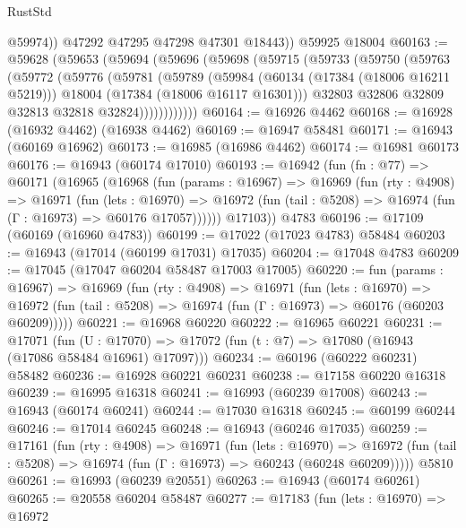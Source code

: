 \begin{lexlean}{RustStd}
\begin{coremodule}
            @59974))
        @47292
        @47295
        @47298
        @47301
        @18443))
    @59925
    @18004
@60163 := @59628
    (@59653
      (@59694
        (@59696
          (@59698
            (@59715
              (@59733
                (@59750
                  (@59763
                    (@59772
                      (@59776
                        (@59781
                          (@59789
                            (@59984
                              (@60134 (@17384 (@18006 @16211 @5219)))
                              @18004
                              (@17384 (@18006 @16117 @16301)))
                            @32803
                            @32806
                            @32809
                            @32813
                            @32818
                            @32824))))))))))))
@60164 := @16926 @4462
@60168 := @16928 (@16932 @4462) (@16938 @4462)
@60169 := @16947 @58481
@60171 := @16943 (@60169 @16962)
@60173 := @16985 (@16986 @4462)
@60174 := @16981 @60173
@60176 := @16943 (@60174 @17010)
@60193 := @16942
    (fun (fn : @77) =>
    @60171
      (@16965
        (@16968
          (fun (params : @16967) =>
          @16969
            (fun (rty : @4908) =>
            @16971
              (fun (lets : @16970) =>
              @16972 (fun (tail : @5208) => @16974 (fun (Γ : @16973) => @60176 @17057))))))
        @17103))
    @4783
@60196 := @17109 (@60169 (@16960 @4783))
@60199 := @17022 (@17023 @4783) @58484
@60203 := @16943 (@17014 (@60199 @17031) @17035)
@60204 := @17048 @4783
@60209 := @17045 (@17047 @60204 @58487 @17003 @17005)
@60220 := fun (params : @16967) =>
  @16969
    (fun (rty : @4908) =>
    @16971
      (fun (lets : @16970) =>
      @16972 (fun (tail : @5208) => @16974 (fun (Γ : @16973) => @60176 (@60203 @60209)))))
@60221 := @16968 @60220
@60222 := @16965 @60221
@60231 := @17071
    (fun (U : @17070) => @17072 (fun (t : @7) => @17080 (@16943 (@17086 @58484 @16961) @17097)))
@60234 := @60196 (@60222 @60231) @58482
@60236 := @16928 @60221 @60231
@60238 := @17158 @60220 @16318
@60239 := @16995 @16318
@60241 := @16993 (@60239 @17008)
@60243 := @16943 (@60174 @60241)
@60244 := @17030 @16318
@60245 := @60199 @60244
@60246 := @17014 @60245
@60248 := @16943 (@60246 @17035)
@60259 := @17161
    (fun (rty : @4908) =>
    @16971
      (fun (lets : @16970) =>
      @16972 (fun (tail : @5208) => @16974 (fun (Γ : @16973) => @60243 (@60248 @60209)))))
    @5810
@60261 := @16993 (@60239 @20551)
@60263 := @16943 (@60174 @60261)
@60265 := @20558 @60204 @58487
@60277 := @17183
    (fun (lets : @16970) =>
    @16972

\end{coremodule}
\end{lexlean}
